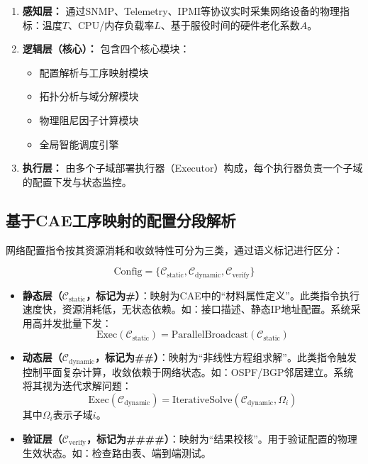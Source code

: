 \documentclass[12pt,a4paper]{article}
\begin{document}
\begin{enumerate}
    \item \textbf{感知层：} 通过SNMP、Telemetry、IPMI等协议实时采集网络设备的物理指标：温度$T$、CPU/内存负载率$L$、基于服役时间的硬件老化系数$A$。
    \item \textbf{逻辑层（核心）：} 包含四个核心模块：
    \begin{itemize}
        \item 配置解析与工序映射模块
        \item 拓扑分析与域分解模块
        \item 物理阻尼因子计算模块
        \item 全局智能调度引擎
    \end{itemize}
    \item \textbf{执行层：} 由多个子域部署执行器（Executor）构成，每个执行器负责一个子域的配置下发与状态监控。
\end{enumerate}

\subsection{基于CAE工序映射的配置分段解析}
\label{subsec:markup}

网络配置指令按其资源消耗和收敛特性可分为三类，通过语义标记进行区分：

\begin{equation}
    \text{Config} = \{ \mathcal{C}_{\text{static}}, \mathcal{C}_{\text{dynamic}}, \mathcal{C}_{\text{verify}} \}
\end{equation}

\begin{itemize}
    \item \textbf{静态层（$\mathcal{C}_{\text{static}}$，标记为\#）}：映射为CAE中的“材料属性定义”。此类指令执行速度快，资源消耗低，无状态依赖。如：接口描述、静态IP地址配置。系统采用高并发批量下发：
    \begin{equation}
        \text{Exec}(\mathcal{C}_{\text{static}}) = \text{ParallelBroadcast}(\mathcal{C}_{\text{static}})
    \end{equation}
    
    \item \textbf{动态层（$\mathcal{C}_{\text{dynamic}}$，标记为\#\#）}：映射为“非线性方程组求解”。此类指令触发控制平面复杂计算，收敛依赖于网络状态。如：OSPF/BGP邻居建立。系统将其视为迭代求解问题：
    \begin{equation}
        \text{Exec}(\mathcal{C}_{\text{dynamic}}) = \text{IterativeSolve}(\mathcal{C}_{\text{dynamic}}, \Omega_i)
    \end{equation}
    其中$\Omega_i$表示子域$i$。
    
    \item \textbf{验证层（$\mathcal{C}_{\text{verify}}$，标记为\#\#\#\#）}：映射为“结果校核”。用于验证配置的物理生效状态。如：检查路由表、端到端测试。
\end{itemize}
\end{document}
